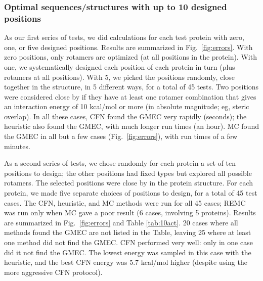 \documentclass[a4paper,12pt]{article}
\begin{document}
\subsubsection{Optimal sequences/structures with up to 10 designed positions}
As our first series of tests, we did calculations for each test protein with zero, one, or five designed positions.
Results are summarized in Fig.\ \ref{fig:errors}. With zero positions, only rotamers are optimized (at all positions
in the protein). With one, we systematically designed each position of each protein in turn (plus rotamers at all
positions). With 5, we picked the positions randomly, close together in the structure, in 5 different ways, for a
total of 45 tests. Two positions were considered close by if they have at least one rotamer combination that gives
an interaction energy of 10 kcal/mol or more (in absolute magnitude; eg, steric overlap). In all these cases, CFN
found the GMEC very rapidly (seconds); the heuristic also found the GMEC, with much longer run times (an hour). MC
found the GMEC in all but a  few cases (Fig.\ \ref{fig:errors}), with run times of a few minutes. 

As a second series of tests, we chose randomly for each protein a set of ten positions to design; the other positions
had fixed types but explored all possible rotamers. The selected positions were close by in the protein structure. For
each protein, we made five separate choices of positions to design, for a total of 45 test cases. The CFN, heuristic,
and MC methods were run for all 45 cases; REMC was run only when MC gave a poor result (6 cases, involving 5 proteins).
Results are summarized in Fig.\ \ref{fig:errors} and Table \ref{tab:10act}. 20 cases where all methods found the GMEC
are not listed in the Table, leaving 25 where at least one method did not find the GMEC. CFN performed very well: only
in one case did it not find the GMEC. The lowest energy was sampled in this case with the heuristic, and the best CFN
energy was 5.7 kcal/mol higher (despite using the more aggressive CFN protocol). 
\end{document}
